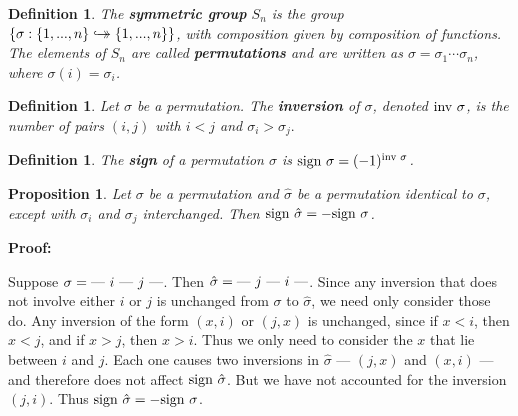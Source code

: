 \documentclass{article}
\theoremstyle{colontheorem}
\newtheorem{proposition}[theorem]{Proposition}
\newtheorem{definition}[theorem]{Definition}
\newenvironment{Proposition}
{
	\begin{mdframed}[backgroundcolor=TheoremOrange!10]
	\begin{proposition}
}
{
	\end{proposition}
	\end{mdframed}
	
	\vspace{.15in}
}
\newenvironment{Def}
{
	\begin{mdframed}[backgroundcolor=DefGreen!10]
	\begin{definition}
}
{
	\end{definition}
	\end{mdframed}
	
	\vspace{.15in}
}
\newenvironment{Proof}
{
	\vspace{-.3in}
	
	\begin{mdframed}[backgroundcolor=ProofPurple!10]
	\textbf{Proof:}%
}
{
	\end{mdframed}
	
	\vspace{.15in}
}
\begin{document}
\begin{Def}
	
	The \textbf{symmetric group} $S_n$ is the group $\{\sigma : \{1, ..., n\} \hookrightarrow\mathrel{\mspace{-15mu}}\rightarrow \{1, ..., n\} \}$, with composition given by composition of functions. The elements of $S_n$ are called \textbf{permutations} and are written as $\sigma = \sigma_1 \cdots \sigma_n$, where $\sigma(i) = \sigma_i$.
	
\end{Def}



\begin{Def}
	
	Let $\sigma$ be a permutation. The \textbf{inversion} of $\sigma$, denoted $\textnormal{inv }\sigma$, is the number of pairs $(i, j)$ with $i < j$ and $\sigma_i > \sigma_j.$
	
\end{Def}



\begin{Def}
	
	The \textbf{sign} of a permutation $\sigma$ is $\textnormal{sign }\sigma = (-1)^{\textnormal{inv }\sigma}$.
	
\end{Def}



\begin{Proposition}
	
	Let $\sigma$ be a permutation and $\hat{\sigma}$ be a permutation identical to $\sigma$, except with $\sigma_i$ and $\sigma_j$ interchanged. Then $\textnormal{sign } \hat{\sigma} = -\textnormal{sign } \sigma$.
	
\end{Proposition}



\begin{Proof}
	Suppose $\sigma = \textnormal{--- } i \textnormal{ --- } j \textnormal{ ---}$. Then $\hat{\sigma} = \textnormal{--- } j \textnormal{ --- } i \textnormal{ ---}$. Since any inversion that does not involve either $i$ or $j$ is unchanged from $\sigma$ to $\hat{\sigma}$, we need only consider those do. Any inversion of the form $(x, i)$ or $(j, x)$ is unchanged, since if $x < i$, then $x < j$, and if $x > j$, then $x > i$. Thus we only need to consider the $x$ that lie between $i$ and $j$. Each one causes two inversions in $\hat{\sigma}$ --- $(j, x)$ and $(x, i)$ --- and therefore does not affect $\textnormal{sign } \hat{\sigma}$. But we have not accounted for the inversion $(j, i)$. Thus $\textnormal{sign } \hat{\sigma} = -\textnormal{sign } \sigma$.
	
\end{Proof}
\end{document}
